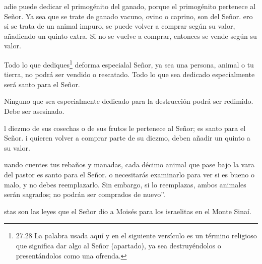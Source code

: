  adie puede dedicar el primogénito del ganado, porque el
primogénito pertenece al Señor. Ya sea que se trate de ganado vacuno,
ovino o caprino, son del Señor.  ero si se trata de un
animal impuro, se puede volver a comprar según su valor, añadiendo un
quinto extra. Si no se vuelve a comprar, entonces se vende según su
valor.

 Todo lo que dediques\footnote{27.28 La palabra usada aquí
  y en el siguiente versículo es un término religioso que significa dar
  algo al Señor (apartado), ya sea destruyéndolos o presentándolos como
  una ofrenda.} deforma especialal Señor, ya sea una persona, animal o
tu tierra, no podrá ser vendido o rescatado. Todo lo que sea dedicado
especialmente será santo para el Señor.

 Ninguno que sea especialmente dedicado para la destrucción
podrá ser redimido. Debe ser asesinado.

 l diezmo de sus cosechas o de sus frutos le pertenece al
Señor; es santo para el Señor.  i quieren volver a comprar
parte de su diezmo, deben añadir un quinto a su valor.

 uando cuentes tus rebaños y manadas, cada décimo animal
que pase bajo la vara del pastor es santo para el Señor.  o
necesitarás examinarlo para ver si es bueno o malo, y no debes
reemplazarlo. Sin embargo, si lo reemplazas, ambos animales serán
sagrados; no podrán ser comprados de nuevo''.

 stas son las leyes que el Señor dio a Moisés para los
israelitas en el Monte Sinaí.
